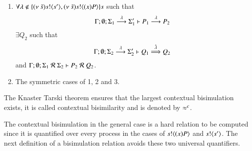 \begin{definition}
\begin{enumerate}
		\item	$\forall \lambda \notin \{(\nu\ \tilde{s}) s ! \langle s' \rangle, (\nu\ \tilde{s}) s ! \langle (x)P \rangle\}s$ such that
			\[
				\Gamma; \emptyset; \Sigma_1 \stackrel{\lambda}{\longrightarrow} \Sigma_1' \vdash P_1 \stackrel{\lambda}{\longrightarrow} P_2
			\]
			$\exists Q_2$ such that 
			\[
				\Gamma; \emptyset; \Sigma_2 \stackrel{\lambda}{\longrightarrow} \Sigma_2' \vdash Q_1 \stackrel{\hat{\lambda}}{\Longrightarrow} Q_2
			\]
			and
			$\Gamma; \emptyset; \Sigma_1\ \mathcal{R}\ \Sigma_2 \proves P_2\ \mathcal{R}\ Q_2$.

		\item	The symmetric cases of 1, 2 and 3.
	\end{enumerate}
	The Knaster Tarski theorem ensures that the largest contextual bisimulation exists, it is called contextual bisimilarity and is denoted by $\approx^c$.
\end{definition}

The contextual bisimulation in the general case is a hard relation to be computed
since it is quantified over every process in the cases of 
$s ! \langle (x)P \rangle$ and $s ! \langle s' \rangle$. The next definition
of a bisimulation relation avoids these two universal quantifiers.


